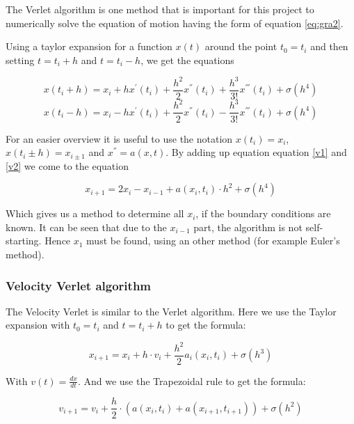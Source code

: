 \documentclass[10pt,a4paper]{article}
\begin{document}
The Verlet algorithm is one method that is important for this project to numerically solve the equation of motion having the form of equation \eqref{eq:gra2}. 

Using a taylor expansion for a function $x(t)$ around the point $t_0 = t_i$ and then setting $t = t_i + h$ and $t = t_i - h$, we get the equations

\begin{equation}
\label{v1}
x(t_i + h) = x_i + h  x^{'}(t_i) + \frac{h^2}{2}  x^{''}(t_i) + \frac{h^3}{3!}  x^{'''}(t_i) + \sigma (h^4)
\end{equation}
\begin{equation}
\label{v2}
x(t_i - h) = x_i - h  x^{'}(t_i) + \frac{h^2}{2}  x^{''}(t_i) - \frac{h^3}{3!}  x^{'''}(t_i) + \sigma (h^4)
\end{equation}

For an easier overview it is useful to use the notation $x(t_i) = x_i$, $x(t_i \pm h) = x_{i \pm 1}$ and $x^{''} = a(x, t)$. By adding up equation equation \eqref{v1} and \eqref{v2} we come to the equation

\begin{equation}
\label{v3}
	x_{i+1} = 2 x_i - x_{i-1} + a(x_i, t_i) \cdot h^2 + \sigma(h^4)
\end{equation}

Which gives us a method to determine all $x_i$, if the boundary conditions are known. It can be seen that due to the $x_{i-1}$ part, the algorithm is not self-starting. Hence $x_1$ must be found, using an other method (for example Euler's method).

\subsubsection{Velocity Verlet algorithm}

The Velocity Verlet is similar to the Verlet algorithm. Here we use the Taylor expansion with $t_0 = t_i$ and $t = t_i + h$ to get the formula: 

\begin{equation}
\label{vv1}
x_{i+1} = x_i + h \cdot v_i + \frac{h^2}{2}  a_i(x_i, t_i) + \sigma (h^3)
\end{equation}

With $v(t) = \frac{dx}{dt}$. And we use the Trapezoidal rule to get the formula:

\begin{equation}
\label{vv2}
v_{i+1} = v_i + \frac{h}{2} \cdot (a(x_i, t_i) + a(x_{i+1}, t_{i+1})) + \sigma(h^2)
\end{equation}
\end{document}
